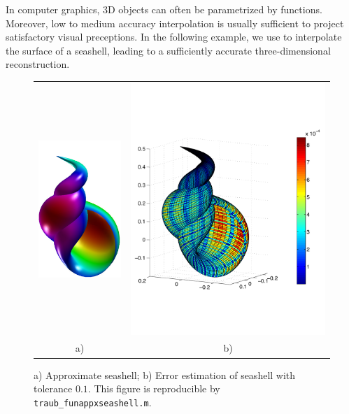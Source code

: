 
In computer graphics, 3D objects can often be parametrized by functions.
Moreover, low to medium accuracy interpolation is usually sufficient to project
satisfactory visual preceptions. In the following example, we use \funappxg to
interpolate the surface of a seashell, leading to a sufficiently accurate
three-dimensional reconstruction.

\begin{figure}[tbh]
  \centering
  \begin{tabular}{cc}
     \includegraphics[width=35mm]{figure/funappxseashell.pdf} 
  & \includegraphics[width=83mm]{figure/seashellsurferror.pdf}
  \\ a)  & b) 
  \end{tabular}
\caption{a) Approximate seashell; b) Error estimation of seashell with tolerance
$0.1$. This figure is reproducible by \texttt{traub\_funappxseashell.m}.}
\label{fig:funappxseashell}
\end{figure}
